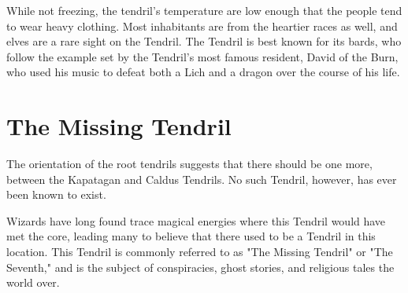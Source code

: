 \begin{multicols}{2}
While not freezing, the tendril's temperature are low enough that the people tend to wear heavy clothing.
Most inhabitants are from the heartier races as well, and elves are a rare sight on the Tendril.
The Tendril is best known for its bards, who follow the example set by the Tendril's most famous resident, David of the Burn, who used his music to defeat both a Lich and a dragon over the course of his life.

\section{The Missing Tendril}
 The orientation of the root tendrils suggests that there should be one more, between the Kapatagan and Caldus Tendrils.
No such Tendril, however, has ever been known to exist.

Wizards have long found trace magical energies where this Tendril would have met the core, leading many to believe that there used to be a Tendril in this location.
This Tendril is commonly referred to as "The Missing Tendril" or "The Seventh," and is the subject of conspiracies, ghost stories, and religious tales the world over.

\end{multicols}
